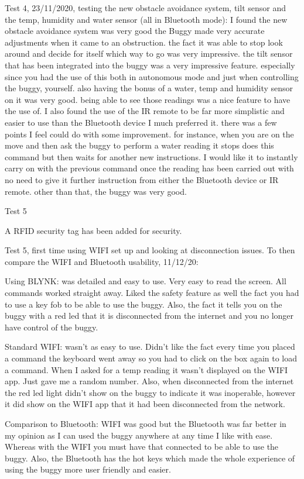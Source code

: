 \documentclass[8pt, a4paper]{article}
\begin{document}
Test 4, 23/11/2020, testing the new obstacle avoidance system, tilt sensor and the temp, humidity and water sensor (all in Bluetooth mode): I found the new obstacle avoidance system was very good the Buggy made very accurate adjustments when it came to an obstruction. the fact it was able to stop look around and decide for itself which way to go was very impressive. the tilt sensor that has been integrated into the buggy was a very impressive feature. especially since you had the use of this both in autonomous mode and just when controlling the buggy, yourself. also having the bonus of a water, temp and humidity sensor on it was very good. being able to see those readings was a nice feature to have the use of. I also found the use of the IR remote to be far more simplistic and easier to use than the Bluetooth device I much preferred it. there was a few points I feel could do with some improvement. for instance, when you are on the move and then ask the buggy to perform a water reading it stops does this command but then waits for another new instructions. I would like it to instantly carry on with the previous command once the reading has been carried out with no need to give it further instruction from either the Bluetooth device or IR remote. other than that, the buggy was very good.

Test 5

A RFID security tag has been added for security. 

Test 5, first time using WIFI set up and looking at disconnection issues. To then compare the WIFI and Bluetooth usability, 11/12/20: 

Using BLYNK: was detailed and easy to use. Very easy to read the screen. All commands worked straight away. Liked the safety feature as well the fact you had to use a key fob to be able to use the buggy. Also, the fact it tells you on the buggy with a red led that it is disconnected from the internet and you no longer have control of the buggy. 

Standard WIFI:  wasn’t as easy to use. Didn’t like the fact every time you placed a command the keyboard went away so you had to click on the box again to load a command. When I asked for a temp reading it wasn’t displayed on the WIFI app. Just gave me a random number. Also, when disconnected from the internet the red led light didn’t show on the buggy to indicate it was inoperable, however it did show on the WIFI app that it had been disconnected from the network.  

Comparison to Bluetooth: WIFI was good but the Bluetooth was far better in my opinion as I can used the buggy anywhere at any time I like with ease. Whereas with the WIFI you must have that connected to be able to use the buggy. Also, the Bluetooth has the hot keys which made the whole experience of using the buggy more user friendly and easier. 
\end{document}
